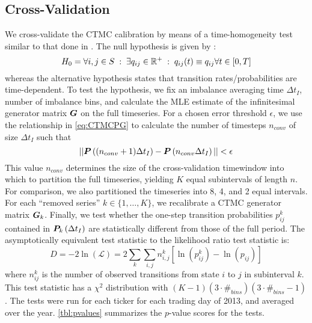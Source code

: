 \subsection{Cross-Validation}
We cross-validate the CTMC calibration by means of a time-homogeneity test similar to that done in \cite{Tan02}. The null hypothesis is given by \cite{Weiss10}:
\begin{equation}
H_0 = \forall i,j \in S \; : \; \exists q_{ij} \in \mathbb{R}^+ \; : \; q_{ij}(t) \equiv q_{ij} \forall t \in [0,T]
\end{equation}
whereas the alternative hypothesis states that transition rates/probabilities are time-dependent. To test the hypothesis, we fix an imbalance averaging time $\Delta t_I$, number of imbalance bins, and calculate the MLE estimate of the infinitesimal generator matrix $\boldsymbol{G}$ on the full timeseries. For a chosen error threshold $\epsilon$, we use the relationship in \eqref{eq:CTMCPG} to calculate the number of timesteps $n_{conv}$ of size $\Delta t_I$ such that
\begin{equation}\label{eq:crossvalidnconv}
|| \boldsymbol{P}\left((n_{conv}+1)\Delta t_I \right) - \boldsymbol{P} \left( n_{conv}\Delta t_I \right) || < \epsilon
\end{equation}
This value $n_{conv}$ determines the size of the cross-validation timewindow into which to partition the full timeseries, yielding $K$ equal subintervals of length $n$. For comparison, we also partitioned the timeseries into 8, 4, and 2 equal intervals. For each ``removed series'' $k \in \{ 1,\dots,K \}$, we recalibrate a CTMC generator matrix $\boldsymbol{G}_{k}$. Finally, we test whether the one-step transition probabilities $p_{ij}^k$ contained in $\boldsymbol{P}_k \left(\Delta t_I \right)$ are statistically different from those of the full period. The asymptotically equivalent test statistic to the likelihood ratio test statistic is:
\begin{equation}
D = -2 \ln (\mathcal{L})  = 2 \sum_k \sum_{i,j} n_{i,j}^k \left[ \ln(p_{ij}^k)  - \ln(p_{ij})   \right]
\end{equation}
where $n_{ij}^k$ is the number of observed transitions from state $i$ to $j$ in subinterval $k$. This test statistic has a $\chi^2$ distribution with $(K-1)(3 \cdot \#_{bins})(3 \cdot \#_{bins} - 1)$. The tests were run for each ticker for each trading day of 2013, and averaged over the year. \autoref{tbl:pvalues} summarizes the $p$-value scores for the tests.
